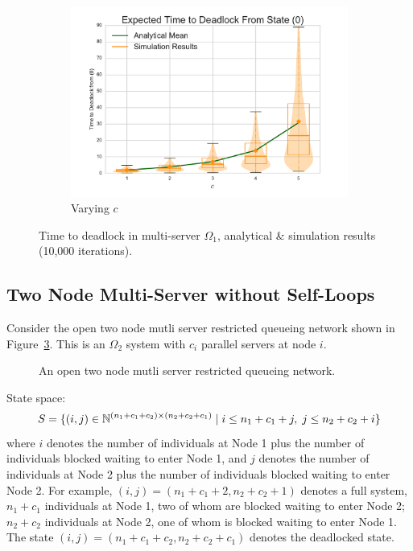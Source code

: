 \documentclass{article}
\numberwithin{equation}{section}
\begin{document}
\begin{figure}[!htbp]
\begin{center}
\begin{subfigure}[b]{0.35\textwidth}
    \includegraphics[width=\textwidth]{images/varyc_1Nms}
    \caption{Varying $c$}
    \label{fig:1Nms_c}
  \end{subfigure}
  \end{center}
  \caption{Time to deadlock in multi-server $\Omega_1$, analytical \& simulation results (10,000 iterations).}
  \label{fig:timestodeadlock1nodemultiserver}
\end{figure}











\subsection{Two Node Multi-Server without Self-Loops}\label{sec:2nodeMS}

Consider the open two node mutli server restricted queueing network shown in Figure~\ref{fig:queueingnetwork_2nodemulti}.
This is an $\Omega_2$ system with $c_i$ parallel servers at node $i$.

\begin{figure}[!htbp]
  \begin{center}
  
  \end{center}
  \caption{An open two node mutli server restricted queueing network.}
  \label{fig:queueingnetwork_2nodemulti}
\end{figure}

State space:
        \[S = \{(i,j)\in\mathbb{N}^{(n_1+c_1+c_2)\times (n_2+c_2+c_1)} \nonscript\; | \nonscript\; i \leq n_1+c_1+j, \nonscript\; j \leq n_2+c_2+i\}\]
where $i$ denotes the number of individuals at Node 1 plus the number of individuals blocked waiting to enter Node 1, and $j$ denotes the number of individuals at Node 2 plus the number of individuals blocked waiting to enter Node 2.
For example, $(i, j) = (n_1+c_1+2, n_2+c_2+1)$ denotes a full system, $n_1+c_1$ individuals at Node 1, two of whom are blocked waiting to enter Node 2; $n_2+c_2$ individuals at Node 2, one of whom is blocked waiting to enter Node 1.
The state $(i, j) = (n_1+c_1+c_2, n_2+c_2+c_1)$ denotes the deadlocked state.
\end{document}
